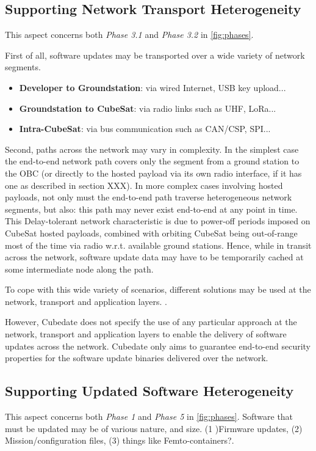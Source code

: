 \subsection{Supporting Network Transport Heterogeneity}
This aspect concerns both \textit{Phase 3.1} and \textit{Phase 3.2} in \autoref{fig:phases}. 

First of all, software updates may be transported over a wide variety of network segments.
\begin{itemize}
\item {\bf Developer to Groundstation}: via wired Internet, USB key upload...
\item {\bf Groundstation to CubeSat}: via radio links such as UHF, LoRa...
\item {\bf Intra-CubeSat}: via bus communication such as CAN/CSP, SPI...
\end{itemize}

Second, paths across the network may vary in complexity.
In the simplest case the end-to-end network path covers only the segment from a ground station to the OBC (or directly to the hosted payload via its own radio interface, if it has one as described in section XXX).
In more complex cases involving hosted payloads, not only
must the end-to-end path traverse heterogeneous network segments,
but also: this path may never exist end-to-end at any point in time.
This Delay-tolerant network characteristic is due to power-off periods imposed on CubeSat hosted payloads, 
combined with orbiting CubeSat being out-of-range most of the time via radio w.r.t. available ground stations.
Hence, while in transit across the network, software update data may have to be temporarily cached at some intermediate node along the path.

To cope with this wide variety of scenarios, different solutions may be used at the network, transport and application layers. . 


However, Cubedate does not specify the use of any particular approach at the network, transport and application layers to enable the delivery of software updates across the network.
Cubedate only aims to guarantee end-to-end security properties for the software update binaries delivered over the network.

\subsection{Supporting Updated Software Heterogeneity}
This aspect concerns both \textit{Phase 1} and \textit{Phase 5} in \autoref{fig:phases}. 
Software that must be updated may be of various nature, and size.
(1 )Firmware updates, (2) Mission/configuration files, (3) things like Femto-containers?.

